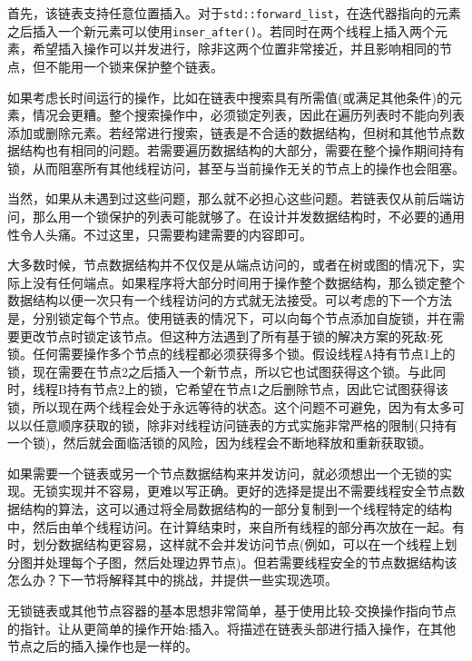 首先，该链表支持任意位置插入。对于\texttt{std::forward\_list}，在迭代器指向的元素之后插入一个新元素可以使用\texttt{inser\_after()}。若同时在两个线程上插入两个元素，希望插入操作可以并发进行，除非这两个位置非常接近，并且影响相同的节点，但不能用一个锁来保护整个链表。

如果考虑长时间运行的操作，比如在链表中搜索具有所需值(或满足其他条件)的元素，情况会更糟。整个搜索操作中，必须锁定列表，因此在遍历列表时不能向列表添加或删除元素。若经常进行搜索，链表是不合适的数据结构，但树和其他节点数据结构也有相同的问题。若需要遍历数据结构的大部分，需要在整个操作期间持有锁，从而阻塞所有其他线程访问，甚至与当前操作无关的节点上的操作也会阻塞。

当然，如果从未遇到过这些问题，那么就不必担心这些问题。若链表仅从前后端访问，那么用一个锁保护的列表可能就够了。在设计并发数据结构时，不必要的通用性令人头痛。不过这里，只需要构建需要的内容即可。

大多数时候，节点数据结构并不仅仅是从端点访问的，或者在树或图的情况下，实际上没有任何端点。如果程序将大部分时间用于操作整个数据结构，那么锁定整个数据结构以便一次只有一个线程访问的方式就无法接受。可以考虑的下一个方法是，分别锁定每个节点。使用链表的情况下，可以向每个节点添加自旋锁，并在需要更改节点时锁定该节点。但这种方法遇到了所有基于锁的解决方案的死敌:死锁。任何需要操作多个节点的线程都必须获得多个锁。假设线程A持有节点1上的锁，现在需要在节点2之后插入一个新节点，所以它也试图获得这个锁。与此同时，线程B持有节点2上的锁，它希望在节点1之后删除节点，因此它试图获得该锁，所以现在两个线程会处于永远等待的状态。这个问题不可避免，因为有太多可以以任意顺序获取的锁，除非对线程访问链表的方式实施非常严格的限制(只持有一个锁)，然后就会面临活锁的风险，因为线程会不断地释放和重新获取锁。

如果需要一个链表或另一个节点数据结构来并发访问，就必须想出一个无锁的实现。无锁实现并不容易，更难以写正确。更好的选择是提出不需要线程安全节点数据结构的算法，这可以通过将全局数据结构的一部分复制到一个线程特定的结构中，然后由单个线程访问。在计算结束时，来自所有线程的部分再次放在一起。有时，划分数据结构更容易，这样就不会并发访问节点(例如，可以在一个线程上划分图并处理每个子图，然后处理边界节点)。但若需要线程安全的节点数据结构该怎么办？下一节将解释其中的挑战，并提供一些实现选项。


无锁链表或其他节点容器的基本思想非常简单，基于使用比较-交换操作指向节点的指针。让从更简单的操作开始:插入。将描述在链表头部进行插入操作，在其他节点之后的插入操作也是一样的。

